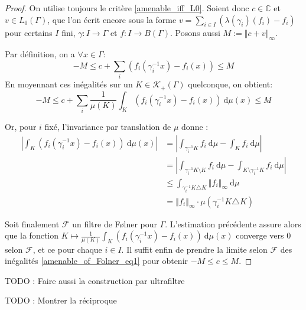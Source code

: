 \documentclass[a4paper,12pt]{article}
\newcommand{\C}{\mathbb{C}}
\newcommand{\norm}[1]{\left\Vert #1\right\Vert}
\newcommand{\abs}[1]{\left\vert#1\right\vert}
\newcommand{\integral}[4]{\int_{#1}^{#2} #3~\mathrm{d}#4}
\newcommand{\inv}{^{-1}}
\newcommand{\TODO}[1]{{\color{red}TODO :} #1}
\begin{document}
\begin{proof}
    On utilise toujours le critère \ref{amenable_iff_L0}. Soient donc $c\in\C$ et $v\in L_0(\Gamma)$, 
    que l'on écrit encore sous la forme $v = \sum_{i\in I} (\lambda(\gamma_i)(f_i) - f_i)$ pour certains $I$ fini, $\gamma : I \to\Gamma$ et
    $f : I\to B(\Gamma)$. Posons aussi $M := \norm{c + v}_\infty$.

    Par définition, on a $\forall x\in\Gamma$:
    \begin{equation*}
        -M \le c + \sum_i (f_i(\gamma_i\inv x) - f_i(x)) \le M
    \end{equation*}
    En moyennant ces inégalités sur un $K\in\mathcal{K}_+(\Gamma)$ quelconque, on obtient:
    \begin{equation}\label{amenable_of_Folner_eq1}
        -M \le c + \sum_i \frac1{\mu(K)} \integral{K}{}{(f_i(\gamma_i\inv x) - f_i(x))}{\mu(x)} \le M
    \end{equation}

    Or, pour $i$ fixé, l'invariance par translation de $\mu$ donne :
    \begin{align*}
        \abs{\integral{K}{}{(f_i(\gamma_i\inv x) - f_i(x))}{\mu(x)}} 
            &= \abs{\integral{\gamma_i\inv K}{}{f_i}{\mu} - \integral{K}{}{f_i}{\mu}} \\
            &= \abs{\integral{\gamma_i\inv K\setminus K}{}{f_i}{\mu} - \integral{K\setminus\gamma_i\inv K}{}{f_i}{\mu}} \\
            &\le \integral{\gamma_i\inv K\triangle K}{}{\norm{f_i}_\infty}{\mu} \\
            &=\norm{f_i}_\infty \cdot \mu(\gamma_i\inv K\triangle K)
    \end{align*}
    
    Soit finalement $\mathscr{F}$ un filtre de F\o{}lner pour $\Gamma$. L'estimation précédente assure alors que
    la fonction $K\mapsto\frac1{\mu(K)} \integral{K}{}{(f_i(\gamma_i\inv x) - f_i(x))}{\mu(x)}$ converge vers $0$
    selon $\mathscr{F}$, et ce pour chaque $i\in I$. Il suffit enfin de prendre la limite selon $\mathscr{F}$ des inégalités \ref{amenable_of_Folner_eq1}
    pour obtenir $-M\le c\le M$. 
\end{proof}

\TODO{Faire aussi la construction par ultrafiltre}

\TODO{Montrer la réciproque}
\end{document}

